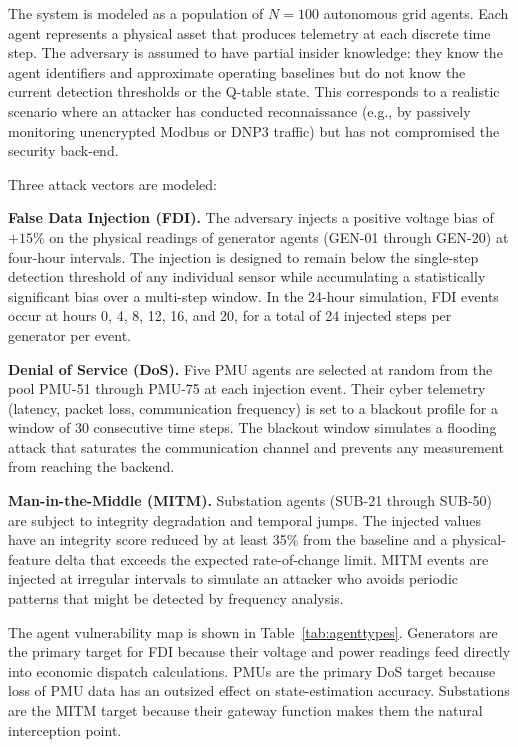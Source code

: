 The system is modeled as a population of $N = 100$ autonomous grid agents. Each agent represents a
physical asset that produces telemetry at each discrete time step. The adversary is assumed to have
partial insider knowledge: they know the agent identifiers and approximate operating baselines but
do not know the current detection thresholds or the Q-table state. This corresponds to a realistic
scenario where an attacker has conducted reconnaissance (e.g., by passively monitoring unencrypted
Modbus or DNP3 traffic) but has not compromised the security back-end.

Three attack vectors are modeled:

\textbf{False Data Injection (FDI).} The adversary injects a positive voltage bias of $+15\%$ on
the physical readings of generator agents (GEN-01 through GEN-20) at four-hour intervals. The
injection is designed to remain below the single-step detection threshold of any individual sensor
while accumulating a statistically significant bias over a multi-step window. In the 24-hour
simulation, FDI events occur at hours 0, 4, 8, 12, 16, and 20, for a total of 24 injected steps
per generator per event.

\textbf{Denial of Service (DoS).} Five PMU agents are selected at random from the pool
PMU-51 through PMU-75 at each injection event. Their cyber telemetry (latency, packet loss,
communication frequency) is set to a blackout profile for a window of 30 consecutive time steps.
The blackout window simulates a flooding attack that saturates the communication channel and
prevents any measurement from reaching the backend.

\textbf{Man-in-the-Middle (MITM).} Substation agents (SUB-21 through SUB-50) are subject to
integrity degradation and temporal jumps. The injected values have an integrity score reduced by at
least 35\% from the baseline and a physical-feature delta that exceeds the expected rate-of-change
limit. MITM events are injected at irregular intervals to simulate an attacker who avoids periodic
patterns that might be detected by frequency analysis.

The agent vulnerability map is shown in Table~\ref{tab:agenttypes}. Generators are the primary
target for FDI because their voltage and power readings feed directly into economic dispatch
calculations. PMUs are the primary DoS target because loss of PMU data has an outsized effect on
state-estimation accuracy. Substations are the MITM target because their gateway function makes
them the natural interception point.

